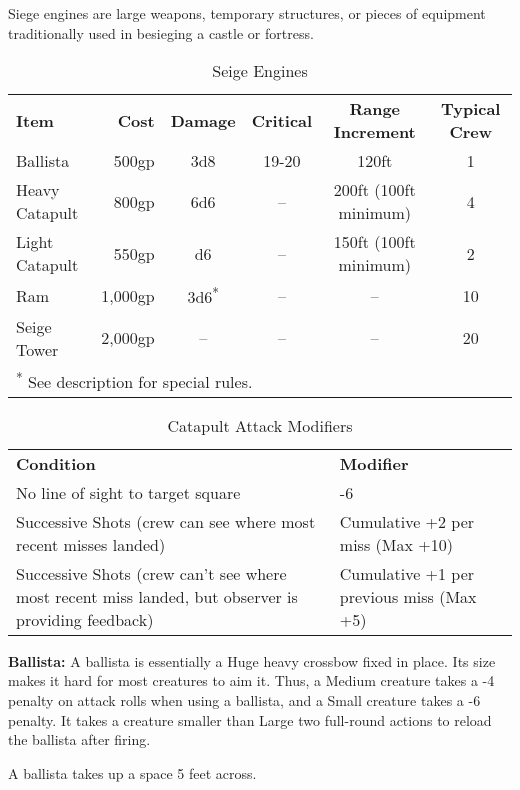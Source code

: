 Siege engines are large weapons, temporary structures, or pieces of equipment traditionally 
used in besieging a castle or fortress.

\begin{table}[htb]
\caption{Seige Engines}
\centering
\begin{tabular}{l r c c c c}
\textbf{Item} & \textbf{Cost} & \textbf{Damage} & \textbf{Critical} & \textbf{Range Increment} & \textbf{Typical Crew}\\
Ballista & 500gp & 3d8 & 19-20 & 120ft & 1\\
Heavy Catapult & 800gp & 6d6 & -- & 200ft (100ft minimum) & 4\\
Light Catapult & 550gp & d6 & -- & 150ft (100ft minimum) & 2\\
Ram & 1,000gp & 3d6\textsuperscript{*} & -- & -- & 10\\
Seige Tower & 2,000gp & -- & -- & -- & 20\\
\multicolumn{6}{l}{\textsuperscript{*} See description for special rules.}\\
\end{tabular}
\end{table}

\begin{table}[htb]
\caption{Catapult Attack Modifiers}
\centering
\begin{tabular}{p{10cm} l}
\textbf{Condition} & \textbf{Modifier}\\
No line of sight to target square & -6\\
Successive Shots (crew can see where most recent misses landed) & Cumulative +2 per miss (Max +10)\\
Successive Shots (crew can't see where most recent miss landed, but observer is providing feedback) & Cumulative +1 per previous miss (Max +5)\\
\end{tabular}
\end{table}

\textbf{Ballista:} A ballista is essentially a Huge heavy crossbow fixed in place. 
Its size makes it hard for most creatures to aim it. Thus, a Medium creature 
takes a -4 penalty on attack rolls when using a ballista, and a Small creature 
takes a -6 penalty. It takes a creature smaller than Large two full-round actions 
to reload the ballista after firing.

A ballista takes up a space 5 feet across.

